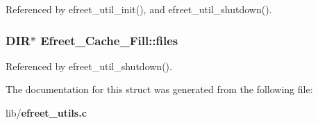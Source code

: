 Referenced by efreet\_\-util\_\-init(), and efreet\_\-util\_\-shutdown().
\subsubsection[files]{\setlength{\rightskip}{0pt plus 5cm}DIR$\ast$ {\bf Efreet\_\-Cache\_\-Fill::files}}\label{structEfreet__Cache__Fill_9d52cafe84aaa951a15147a2b32bf30b}




Referenced by efreet\_\-util\_\-shutdown().

The documentation for this struct was generated from the following file:\begin{CompactItemize}
\item 
lib/{\bf efreet\_\-utils.c}\end{CompactItemize}
